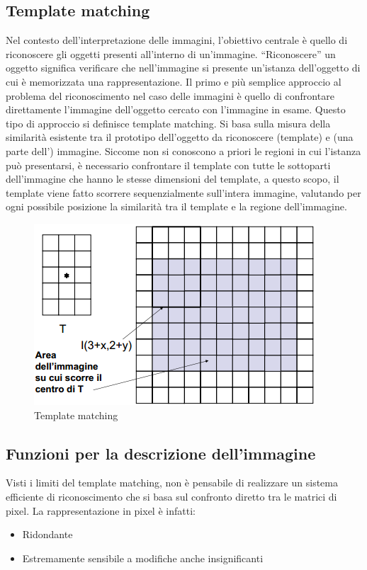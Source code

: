 \subsection{Template matching} 
Nel contesto dell’interpretazione delle immagini, l’obiettivo centrale è
quello di  riconoscere gli oggetti presenti all’interno di  un’immagine.
“Riconoscere” un oggetto significa verificare che nell’immagine si presente
un’istanza  dell’oggetto di cui è memorizzata una rappresentazione. Il primo e
più semplice approccio al problema  del riconoscimento nel caso delle immagini
è  quello di confrontare direttamente l’immagine  dell’oggetto cercato con
l’immagine in esame. Questo tipo di approccio si definisce template matching.
Si basa sulla misura della similarità  esistente tra il prototipo dell’oggetto
da  riconoscere (template) e (una parte dell’)  immagine. Siccome non si
conoscono a priori le regioni in cui l’istanza può presentarsi, è necessario
confrontare il template con tutte le sottoparti  dell’immagine che hanno le
stesse  dimensioni del template, a questo scopo, il template viene fatto
scorrere sequenzialmente sull’intera  immagine, valutando per ogni possibile
posizione la similarità tra il template e la  regione dell’immagine.


\begin{figure}[h]
\centering
\includegraphics[width=.8\textwidth]{img/template-matching.png}
\caption{Template matching}
\label{fig:template-matching}
\end{figure}
\subsection{Funzioni per la descrizione dell'immagine}

Visti i limiti del template matching, non è 
pensabile di realizzare un sistema efficiente 
di riconoscimento che si basa sul confronto 
diretto tra le matrici di pixel.
La rappresentazione in pixel è infatti:
\begin{itemize}
\item Ridondante
\item Estremamente sensibile a modifiche anche 
insignificanti
\end{itemize}

